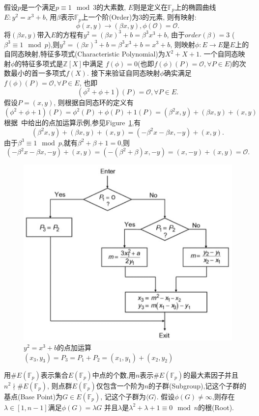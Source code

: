 \documentclass{article}
\newcommand{\Z}{\mathbb{Z}}
\newcommand{\F}{\mathbb{F}}
\begin{document}
假设$p$是一个满足$p\equiv 1 \mod 3$的大素数, $E$则是定义在$\F_p$上的椭圆曲线$E: y^2 = x^3 + b$,
用$\beta$表示$\F_p$上一个阶(Order)为3的元素, 则有映射:
$$\phi(x,y) \rightarrow (\beta x, y), \phi(\mathcal{O}) = \mathcal{O}.$$
将$(\beta x, y)$带入$E$的方程有$y^2 = (\beta x)^3 + b = \beta^3x^3 + b$,
由于$order(\beta)=3$ ($\beta^3 \equiv 1 \mod p$),则$y^2 = (\beta x)^3 + b = \beta^3x^3 + b  = x^3 + b$,
则映射$\phi: E \rightarrow E$是$E$上的自同态映射,特征多项式(Characteristic Polynomial)为$X^2 + X + 1$.
一个自同态映射$\phi$的特征多项式是$\Z[X]$中满足
$f(\phi)=0$(也即$f(\phi)(P)=\mathcal{O}, \forall P\in E$)的次数最小的首一多项式$f(X)$.
接下来验证自同态映射$\phi$确实满足$f(\phi)(P)=\mathcal{O}, \forall P\in E$, 也即
$$(\phi^2+\phi+1)(P) = \mathcal{O}, \forall P \in E.$$
假设$P=(x,y)$, 则根据自同态环的定义有
$$(\phi^2+\phi+1)(P) = \phi^2(P) + \phi(P) +1(P) = (\beta^2 x, y) + (\beta x, y) + (x,y)$$
根据~\cite{Blahut14}中给出的点加运算示例,参见Figure~\ref{fig-ecpoint-add},有
 $$(\beta^2 x, y) + (\beta x, y) + (x,y) = (-\beta^2 x -\beta x, -y) + (x,y).$$
 由于$\beta^3 \equiv 1 \mod p$,就有$\beta^2+\beta+1=0$,则
$$ (-\beta^2 x -\beta x, -y) + (x,y) = (-(\beta^2+\beta) x, -y) = (x,-y) + (x,y) = \mathcal{O}.$$
 
\begin{figure}
\centering
\includegraphics[width=.7\textwidth]{ec-point-addition.png}
\caption{$y^2=x^3+b$的点加运算$(x_3,y_3)=P_3=P_1+P_2=(x_1,y_1) + (x_2,y_2)$}\label{fig-ecpoint-add}
\end{figure}

用$\#E(\F_p)$表示集合$E(\F_p)$中点的个数,用$n$表示$\#E(\F_p)$的最大素因子并且$n^2 \nmid \#E(\F_p)$,
则点群$E(\F_p)$仅包含一个阶为$n$的子群(Subgroup),记这个子群的基点(Base Point)为$G\in E(\F_p)$, 
记这个子群为$\langle G \rangle$. 
假设$\phi(G)\neq \infty$,则存在$\lambda\in [1, n-1]$满足$\phi(G) = \lambda G$
并且$\lambda$是$\lambda^2+\lambda+1\equiv 0 \mod n$的根(Root).
\end{document}
